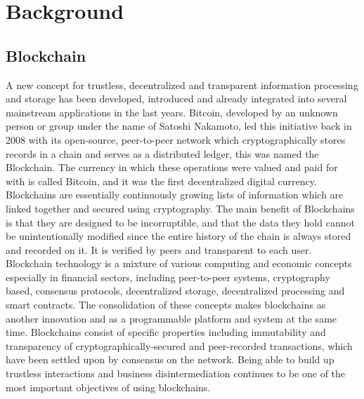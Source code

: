 \section{Background}

\subsection{Blockchain}

A new concept for trustless, decentralized and transparent information processing and storage has been developed, introduced and already integrated into several mainstream applications in the last years. Bitcoin, developed by an unknown person or group under the name of Satoshi Nakamoto, led this initiative back in 2008 with its open-source, peer-to-peer network which cryptographically stores records in a chain and serves as a distributed ledger, this was named the Blockchain. The currency in which these operations were valued and paid for with is called Bitcoin, and it was the first decentralized digital currency.
Blockchains are essentially continuously growing lists of information which are linked together and secured using cryptography. The main benefit of Blockchains is that they are designed to be incorruptible, and that the data they hold cannot be unintentionally modified since the entire history of the chain is always stored and recorded on it. It is verified by peers and transparent to each user.
Blockchain technology is a mixture of various computing and economic concepts especially in financial sectors, including peer-to-peer systems, cryptography based, consensus protocols, decentralized storage, decentralized processing and smart contracts. The consolidation of these concepts makes blockchains as another innovation and as a programmable platform and system at the same time. Blockchains consist of specific properties including immutability and transparency of cryptographically-secured and peer-recorded transactions, which have been settled upon by consensus on the network. Being able to build up trustless interactions and business disintermediation continues to be one of the most important objectives of using blockchains.

